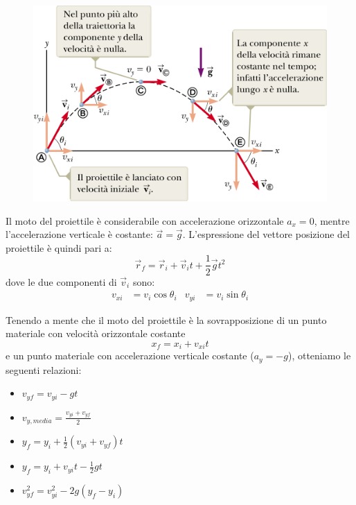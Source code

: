 \documentclass[a4paper,11pt,oneside]{book}
\begin{document}
\begin{figure}[h]
    \centering
    \includegraphics[scale=0.5]{moto_proiettili}
\end{figure}

Il moto del proiettile è considerabile con accelerazione orizzontale $a_x = 0$,
mentre l'accelerazione verticale è costante: $\vec{a} = \vec{g}$. L'espressione del vettore posizione del proiettile è quindi pari a:
\begin{equation*}
    \vec{r}_f = \vec{r}_i + \vec{v}_i t + \frac{1}{2} \vec{g}t^2
\end{equation*}
dove le due componenti di $\vec{v}_i$ sono:
\begin{align*}
    v_{xi} & = v_i \cos{\theta_i} & v_{yi} & = v_i \sin{\theta_i}
\end{align*}

Tenendo a mente che il moto del proiettile è la sovrapposizione di un punto materiale con velocità orizzontale costante
\begin{equation*}
    x_f = x_i + v_{xi}t
\end{equation*}
e un punto materiale
con accelerazione verticale costante ($a_y = -g$), otteniamo le seguenti relazioni:
\begin{itemize}
    \item $v_{yf} = v_{yi} - gt$
    \item $v_{y,media} = \frac{v_{yi} + v_{yf}}{2}$
    \item $y_f = y_i + \frac{1}{2} (v_{yi} + v_{yf})t$
    \item $y_f = y_i + v_{yi}t - \frac{1}{2} gt$
    \item $v_{yf}^2 = v_{yi}^2 -2g(y_f - y_i)$
\end{itemize}
\end{document}
